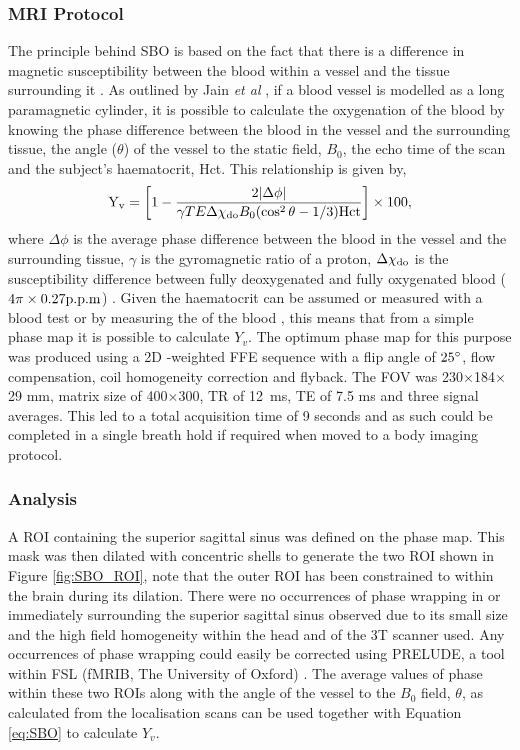 \subsubsection{\ac{MRI} Protocol}
\label{sec:SBO_prot}
The principle behind \ac{SBO} is based on the fact that there is a difference in magnetic susceptibility between the blood within a vessel and the tissue surrounding it \cite{haacke_vivo_1997}. As outlined by Jain \textit{et al} \cite{jain_mri_2010}, if a blood vessel is modelled as a long paramagnetic cylinder, it is possible to calculate the oxygenation of the blood by knowing the phase difference between the blood in the vessel and the surrounding tissue, the angle ($\theta$) of the vessel to the static field, $B_0$, the echo time of the scan and the subject's haematocrit, Hct. This relationship is given by,
\begin{equation}
\textup{Y}_{\textup{v}} = \left[ 1-\frac{2|\Delta\phi|}{\gamma TE\Delta\chi_{\textup{do}}B_0(\cos^2\theta-1/3)\textup{Hct}}\right]\times 100,
\label{eq:SBO}
\end{equation}
where $\Delta\phi$ is the average phase difference between the blood in the vessel and the surrounding tissue, $\gamma$ is the gyromagnetic ratio of a proton, $\Delta\chi_{\textup{do}}$ is the susceptibility difference between fully deoxygenated and fully oxygenated blood ($4\pi\times0.27\textup{p.p.m}$) \cite{spees_water_2001, jain_investigating_2012}. Given the haematocrit can be assumed or measured with a blood test or by measuring the \tone of the blood \cite{lu_determining_2004}, this means that from a simple phase map it is possible to calculate $Y_v$. The optimum phase map for this purpose was produced using a 2D \tone-weighted \ac{FFE} sequence with a flip angle of $25\degree$, flow compensation, coil homogeneity correction and flyback. The \ac{FOV} was 230$\times$184$\times$29 mm, matrix size of 400$\times$300, \ac{TR} of 12~ms, \ac{TE} of 7.5 ms and three signal averages. This led to a total acquisition time of 9 seconds and as such could be completed in a single breath hold if required when moved to a body imaging protocol.

\subsubsection{Analysis}

A \ac{ROI} containing the superior sagittal sinus was defined on the phase map. This mask was then dilated with concentric shells to generate the two \ac{ROI} shown in Figure \ref{fig:SBO_ROI}, note that the outer \ac{ROI} has been constrained to within the brain during its dilation. There were no occurrences of phase wrapping in or immediately surrounding the superior sagittal sinus observed due to its small size and the high field homogeneity within the head and of the 3T scanner used. Any occurrences of phase wrapping could easily be corrected using \ac{PRELUDE}, a tool within \ac{FSL} (fMRIB, The University of Oxford) \cite{jenkinson_fast_2003}. The average values of phase within these two \acp{ROI} along with the angle of the vessel to the $B_0$ field, $\theta$, as calculated from the localisation scans can be used together with Equation \eqref{eq:SBO} to calculate $Y_v$.

